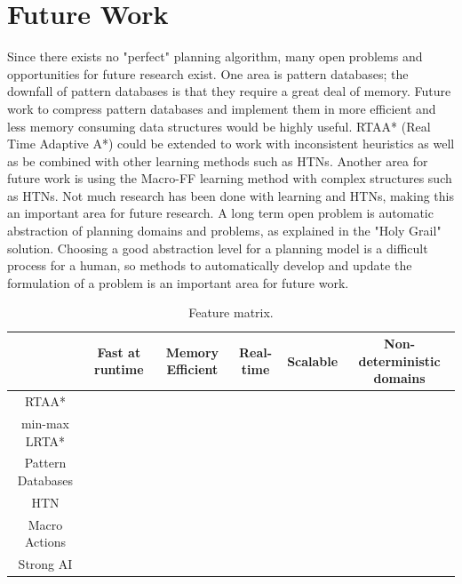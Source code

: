 \documentclass[tog]{acmsiggraph}
\newcommand{\cmark}{\color{Green}{\ding{51}}}
\newcommand{\xmark}{\color{Red}{\ding{55}}}
\begin{document}
\section{Future Work}
Since there exists no "perfect" planning algorithm, many open problems
and opportunities for future research exist. One area is pattern
databases; the downfall of pattern databases is that they require a
great deal of memory. Future work to compress pattern databases and
implement them in more efficient and less memory consuming data
structures would be highly useful. RTAA* (Real Time Adaptive A*) could
be extended to work with inconsistent heuristics as well as be
combined with other learning methods such as HTNs. Another area for
future work is using the Macro-FF learning method with complex
structures such as HTNs. Not much research has been done with learning
and HTNs, making this an important area for future research. A long
term open problem is automatic abstraction of planning domains and
problems, as explained in the "Holy Grail" solution. Choosing a good
abstraction level for a planning model is a difficult process for a
human, so methods to automatically develop and update the formulation
of a problem is an important area for future work.

\begin{table}
  \centering
  \begin{tabular}{|c|c| c |c|c|c|}
    \hline
     & Fast at runtime & Memory Efficient & Real-time & Scalable & Non-deterministic domains\\
     \hline
    RTAA* & \cmark & \cmark & \cmark & \xmark  & \cmark \\
    \hline
    min-max LRTA* & \cmark & \cmark & \cmark & \xmark  & \cmark \\
    \hline
    Pattern Databases & \cmark & \xmark & \xmark & \cmark & \xmark\\
    \hline
    HTN   & \xmark & \cmark & \xmark & \cmark & \xmark \\
    \hline
    Macro Actions & \cmark & \cmark & \xmark & \cmark & \xmark \\
    \hline
    Strong AI & \cmark & \cmark & \cmark & \cmark & \cmark\\
    \hline
  \end{tabular}
  \caption{Feature matrix.}
  \label{table:feature_matrix}
\end{table}
\end{document}
